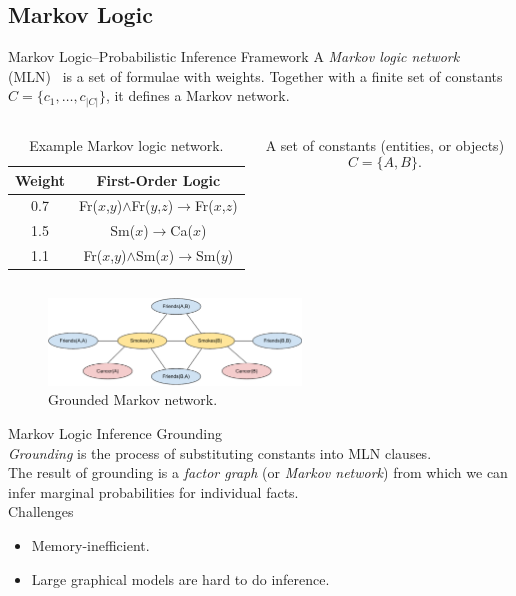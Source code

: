 \documentclass[onlymath,xcolor=pdftex,dvipsnames,table]{beamer}
\let\oldemph\emph
\renewcommand{\emph}[1]{{\color{Blue}\oldemph{#1}}}
\newcommand{\head}[1]{{\large\color{OliveGreen}#1\\[5pt]}}
\begin{document}
\subsection{Markov Logic}
\begin{frame}{Markov Logic--Probabilistic Inference Framework}
A \emph{Markov logic network} (MLN)~\cite{richardson2006markov} is a set of formulae with weights. Together with a finite set of constants $C=\{c_1,\ldots,c_{\left\vert C\right\vert}\}$, it defines a Markov network.

\begin{columns}[c]
  \begin{table}\tiny
    \centering
    \begin{tabular}{cc}\toprule
      \textbf{Weight} & \textbf{First-Order Logic}\\\midrule
      0.7 & Fr($x$,$y$)$\wedge$Fr($y$,$z$)$\rightarrow$Fr($x$,$z$)\\
      1.5 & Sm($x$)$\rightarrow$Ca($x$)\\
      1.1 & Fr($x$,$y$)$\wedge$Sm($x$)$\rightarrow$Sm($y$)\\
      \bottomrule
    \end{tabular}
    \caption{Example Markov logic network.}
    \label{tab:mln}
  \end{table}

  A set of constants (entities, or objects) $$C=\{A,B\}.$$
\end{columns}\vspace{-25pt}
\begin{figure}
  \centering
  \includegraphics[width=0.6\textwidth]{mrf.pdf}
  \caption{Grounded Markov network.}
  \label{fig:ground}
\end{figure}
\end{frame}


\begin{frame}{Markov Logic Inference}
\head{Grounding}
\emph{Grounding} is the process of substituting constants into MLN clauses.\\[5pt]

The result of grounding is a \emph{factor graph} (or \emph{Markov network}) from which we can infer marginal probabilities for individual facts.\\[15pt]

\head{Challenges}
\begin{itemize}
  \item Memory-inefficient.
  \item Large graphical models are hard to do inference.
\end{itemize}
\end{frame}
\end{document}
